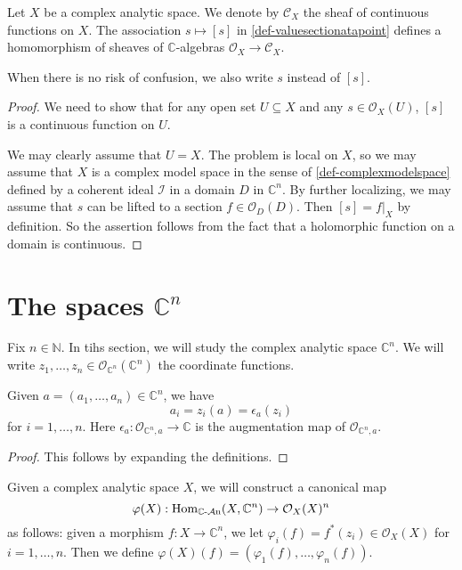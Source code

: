 \begin{lemma}
    Let $X$ be a complex analytic space. We denote by $\mathcal{C}_X$ the sheaf of continuous functions on $X$. 
    The association $s\mapsto [s]$ in \cref{def-valuesectionatapoint} defines a homomorphism of sheaves of $\mathbb{C}$-algebras $\mathcal{O}_X\rightarrow \mathcal{C}_X$. 
\end{lemma}
When there is no risk of confusion, we also write $s$ instead of $[s]$.
\begin{proof}
    We need to show that for any open set $U\subseteq X$ and any $s\in \mathcal{O}_X(U)$, $[s]$ is a continuous function on $U$. 
    
    We may clearly assume that $U=X$. The problem is local on $X$, so we may assume that $X$ is a complex model space in the sense of \cref{def-complexmodelspace} defined by a coherent ideal $\mathcal{I}$ in a domain $D$ in $\mathbb{C}^n$. By further localizing, we may assume that $s$ can be lifted to a section $f\in\mathcal{O}_D(D)$. Then $[s]=f|_X$ by definition. So the assertion follows from the fact that a holomorphic function on a domain is continuous.
\end{proof}

\section{The spaces \texorpdfstring{$\mathbb{C}^n$}{Cn}}
Fix $n\in \mathbb{N}$. In tihs section, we will study the complex analytic space $\mathbb{C}^n$. We will write $z_1,\ldots,z_n\in \mathcal{O}_{\mathbb{C}^n}(\mathbb{C}^n)$ the coordinate functions.

\begin{lemma}\label{lma-coorCnintermsaug}
    Given $a=(a_1,\ldots,a_n)\in \mathbb{C}^n$, we have
    \[
        a_i=z_i(a)=\epsilon_a(z_i)  
    \]
    for $i=1,\ldots,n$. Here $\epsilon_a:\mathcal{O}_{\mathbb{C}^n,a}\rightarrow \mathbb{C}$ is the augmentation map of $\mathcal{O}_{\mathbb{C}^n,a}$.
\end{lemma}
\begin{proof}
    This follows by expanding the definitions.
\end{proof}

Given a complex analytic space $X$, we will construct a canonical map
\begin{equation}\label{eq-varphiXglobal}
    \varphi(X):\operatorname{Hom}_{\mathbb{C}\text{-}\mathcal{A}\mathrm{n}}(X,\mathbb{C}^n)\rightarrow \mathcal{O}_X(X)^n
\end{equation}
as follows: given a morphism $f:X\rightarrow \mathbb{C}^n$, we let $\varphi_i(f)=f^*(z_i)\in \mathcal{O}_X(X)$ for $i=1,\ldots,n$. Then we define $\varphi(X)(f)=(\varphi_1(f),\ldots,\varphi_n(f))$.


